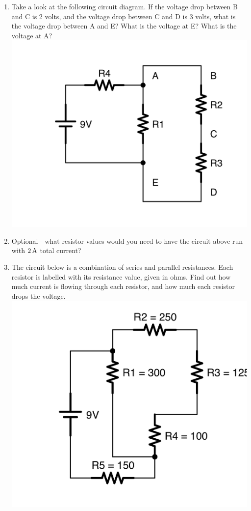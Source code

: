 \begin{enumerate}
\item Take a look at the following circuit diagram.  If the voltage drop between B and C is 2 volts, and the voltage drop between C and D is 3 volts, what is the voltage drop between A and E?  What is the voltage at E?  What is the voltage at A? \\ \includegraphics[scale=0.08]{VoltageDropProblem.png}
\item Optional - what resistor values would you need to have the circuit above run with $2\,\si{\ampere}$ total current?
\item The circuit below is a combination of series and parallel resistances.  Each resistor is labelled with its resistance value, given in ohms.  Find out how much current is flowing through each resistor, and how much each resistor drops the voltage.  \\ \includegraphics[scale=0.08]{ProblemCalculateCurrentAndVoltage.png}
\end{enumerate}
